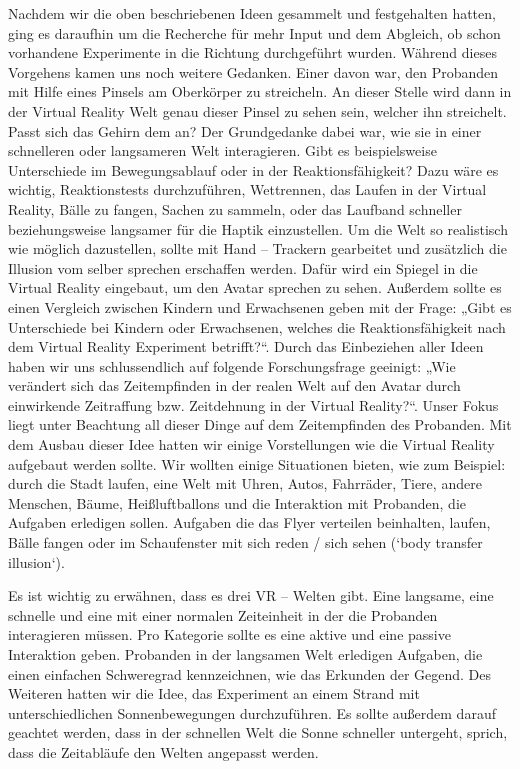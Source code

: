 \documentclass{Bericht}
\begin{document}
	Nachdem wir die oben beschriebenen Ideen gesammelt und festgehalten hatten, ging es daraufhin um die Recherche für mehr Input und dem Abgleich, ob schon vorhandene Experimente in die Richtung durchgeführt wurden. Während dieses Vorgehens kamen uns noch weitere Gedanken. Einer davon war, den Probanden mit Hilfe eines Pinsels am Oberkörper zu streicheln. An dieser Stelle wird dann in der Virtual Reality Welt genau dieser Pinsel zu sehen sein, welcher ihn streichelt. Passt sich das Gehirn dem an? Der Grundgedanke dabei war, wie sie in einer schnelleren oder langsameren Welt interagieren. Gibt es beispielsweise Unterschiede im Bewegungsablauf oder in der Reaktionsfähigkeit? Dazu wäre es wichtig, Reaktionstests durchzuführen, Wettrennen, das Laufen in der Virtual Reality, Bälle zu fangen, Sachen zu sammeln, oder das Laufband schneller beziehungsweise langsamer für die Haptik einzustellen. Um die Welt so realistisch wie möglich dazustellen, sollte mit Hand – Trackern gearbeitet und zusätzlich die Illusion vom selber sprechen erschaffen werden. Dafür wird ein Spiegel in die Virtual Reality eingebaut, um den Avatar sprechen zu sehen. Außerdem sollte es einen Vergleich zwischen Kindern und Erwachsenen geben mit der Frage: „Gibt es Unterschiede bei Kindern oder Erwachsenen, welches die Reaktionsfähigkeit nach dem Virtual Reality Experiment betrifft?“. Durch das Einbeziehen aller Ideen haben wir uns schlussendlich auf folgende Forschungsfrage geeinigt: „Wie verändert sich das Zeitempfinden in der realen Welt auf den Avatar durch einwirkende Zeitraffung bzw. Zeitdehnung in der Virtual Reality?“. Unser Fokus liegt unter Beachtung all dieser Dinge auf dem Zeitempfinden des Probanden. Mit dem Ausbau dieser Idee hatten wir einige Vorstellungen wie die Virtual Reality aufgebaut werden sollte. Wir wollten einige Situationen bieten, wie zum Beispiel: durch die Stadt laufen, eine Welt mit Uhren, Autos, Fahrräder, Tiere, andere Menschen, Bäume, Heißluftballons und die Interaktion mit Probanden, die Aufgaben erledigen sollen. Aufgaben die das Flyer verteilen beinhalten, laufen, Bälle fangen oder im Schaufenster mit sich reden / sich sehen (‘body transfer illusion‘).

	Es ist wichtig zu erwähnen, dass es drei VR – Welten gibt. Eine langsame, eine schnelle und eine mit einer normalen Zeiteinheit in der die Probanden interagieren müssen. Pro Kategorie sollte es eine aktive und eine passive Interaktion geben. Probanden in der langsamen Welt erledigen Aufgaben, die einen einfachen Schweregrad kennzeichnen, wie das Erkunden der Gegend. Des Weiteren hatten wir die Idee, das Experiment an einem Strand mit unterschiedlichen Sonnenbewegungen durchzuführen. Es sollte außerdem darauf geachtet werden, dass in der schnellen Welt die Sonne schneller untergeht, sprich, dass die Zeitabläufe den Welten angepasst werden.
\end{document}

